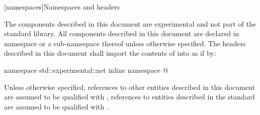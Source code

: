 
[namespaces]{Namespaces and headers}

\pnum
The components described in this document are experimental and not part of the \Cpp standard library. All components described in this document are declared in namespace  or a sub-namespace thereof unless otherwise specified. The headers described in this document shall import the contents of  into  as if by:

\begin{codeblock}
namespace std::experimental::net {
      inline namespace @\namespacever@ {}
}
\end{codeblock}

\pnum
Unless otherwise specified, references to other entities described in this document are assumed to be qualified with , references to entities described in the \Cpp standard are assumed to be qualified with .


